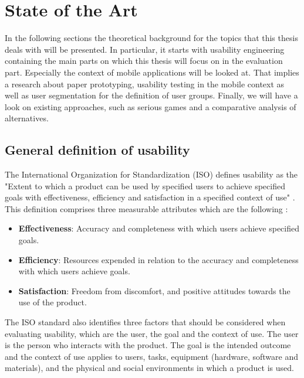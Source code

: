 \chapter{State of the Art}

In the following sections the theoretical background for the topics that this thesis deals with will be presented. In particular, it starts with usability engineering containing the main parts on which this thesis will focus on in the evaluation part. Especially the context of mobile applications will be looked at. That implies a research about paper prototyping, usability testing in the mobile context as well as user segmentation for the definition of user groups. Finally, we will have a look on existing approaches, such as serious games and a comparative analysis of alternatives.

\section{General definition of usability}

The International Organization for Standardization (ISO) defines usability as the "Extent to which a product can be used by specified users to achieve specified goals with effectiveness, efficiency and satisfaction in a specified context of use" \cite{bevan1998iso}. This definition comprises three measurable attributes which are the following \cite{din19989241}:

\begin{itemize}
	\item \textbf{Effectiveness}: Accuracy and completeness with which users achieve specified goals.
	\item \textbf{Efficiency}: Resources expended in relation to the accuracy and completeness with which users achieve goals.	
	\item \textbf{Satisfaction}: Freedom from discomfort, and positive attitudes towards the use of the product.
\end{itemize}

The ISO standard also identifies three factors that should be considered when evaluating usability, which are the user, the goal and the context of use. The user is the person who interacts with the product. The goal is the intended outcome and the context of use applies to users, tasks, equipment (hardware, software and materials), and the physical and social environments in which a product is used.

